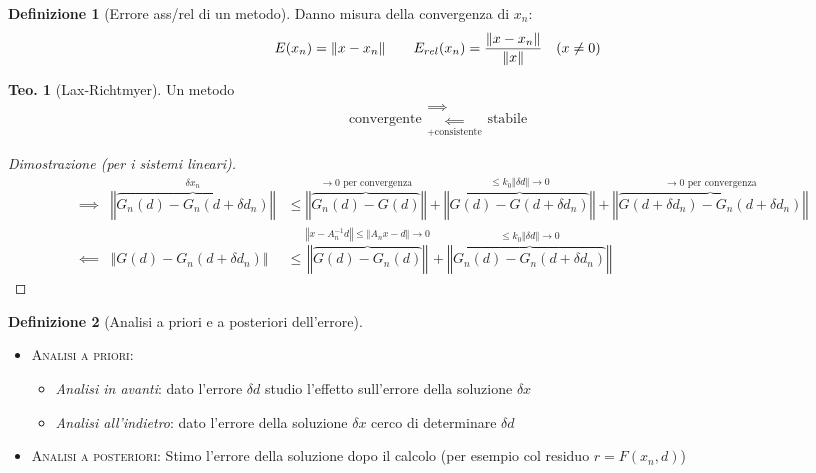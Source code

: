 \documentclass[a4paper,10pt]{article}
\theoremstyle{definition}
\newcommand{\noun}[1]{\textsc{#1}}
\theoremstyle{indentdefinition}
\newtheorem{defn}{Definizione}[section]
\theoremstyle{indenttheorem}
\newtheorem{thm}{Teo.}
\theoremstyle{myremark}
\theoremstyle{indentgeneral}
\theoremstyle{plain}
\theoremstyle{plain}
\begin{document}
\begin{defn}[Errore ass/rel di un metodo]
Danno misura della convergenza di $x_n$:
$$E(x_n)=\norm{x-x_n}\quad \quad E_{rel}(x_n)=\frac{\norm{x-x_n}}{\norm{x}}\quad (x\ne0)$$
\end{defn}

\begin{thm}[Lax-Richtmyer]
Un metodo 
$$\text{convergente} \begin{array}{c}
     \implies \\
     \underset{+\text{consistente}}{\impliedby}
\end{array} \text{stabile}$$
\end{thm}

\begin{proof}[Dimostrazione (per i sistemi lineari)]
\begin{align*}
 & \implies & \overset{\delta x_{n}}{\left\Vert \overbrace{G_{n}\left(d\right)-G_{n}\left(d+\delta d_{n}\right)}\right\Vert } & \leq\overset{\longrightarrow0\text{ per convergenza}}{\left\Vert \overbrace{G_{n}\left(d\right)-G\left(d\right)}\right\Vert }+\overset{\leq k_{0}\left\Vert \delta d\right\Vert \longrightarrow0}{\left\Vert \overbrace{G\left(d\right)-G\left(d+\delta d_{n}\right)}\right\Vert }+\overset{\longrightarrow0\text{ per convergenza}}{\left\Vert \overbrace{G\left(d+\delta d_{n}\right)-G_{n}\left(d+\delta d_{n}\right)}\right\Vert }\\
 & \impliedby & \left\Vert G\left(d\right)-G_{n}\left(d+\delta d_{n}\right)\right\Vert  & \leq\overset{\left\Vert x-A_{n}^{-1}d\right\Vert \leq\left\Vert A_{n}x-d\right\Vert \longrightarrow0}{\left\Vert \overbrace{G\left(d\right)-G_{n}\left(d\right)}\right\Vert }+\overset{\leq k_{0}\left\Vert \delta d\right\Vert \longrightarrow0}{\left\Vert \overbrace{G_{n}\left(d\right)-G_{n}\left(d+\delta d_{n}\right)}\right\Vert }
\end{align*}
\end{proof}
\begin{defn}[Analisi a priori e a posteriori dell'errore]
\end{defn}

\begin{itemize}
\item \noun{Analisi a priori}:
\begin{itemize}
\item \emph{Analisi in avanti}: dato l'errore $\delta d$ studio l'effetto
sull'errore della soluzione $\delta x$
\item \emph{Analisi all'indietro}: dato l'errore della soluzione $\delta x$
cerco di determinare $\delta d$
\end{itemize}
\item \noun{Analisi a posteriori}: Stimo l'errore della soluzione dopo il
calcolo (per esempio col residuo $r=F\left(x_{n},d\right)$)
\end{itemize}
\end{document}
